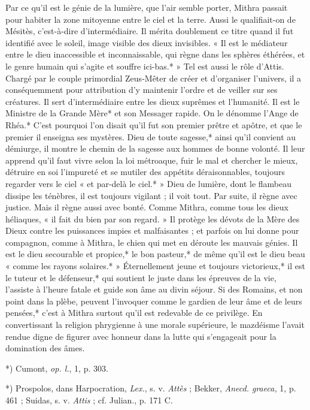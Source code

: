 \documentclass[a4paper, 11pt, oneside, polutonikogreek, french]{article}
\begin{document}
Par ce qu'il est le génie de la lumière, que l'air semble porter, Mithra passait pour habiter la zone mitoyenne entre le ciel et la terre. Aussi le qualifiait-on de Mésitès, c'est-à-dire d'intermédiaire. Il mérita doublement ce titre quand il fut identifié avec le soleil, image visible des dieux invisibles. « Il est le médiateur entre le dieu inaccessible et inconnaissable, qui règne dans les sphères éthérées, et le genre humain qui s'agite et souffre ici-bas.* » Tel est aussi le rôle d'Attis. Chargé par le couple primordial Zeus-Mêter de créer et d'organiser l'univers, il a conséquemment pour attribution d'y maintenir l'ordre et de veiller sur ses créatures. Il sert d'intermédiaire entre les dieux suprêmes et l'humanité. Il est le Ministre de la Grande Mère* et son Messager rapide. On le dénomme l'Ange de Rhéa.* C'est pourquoi l'on disait qu'il fut son premier prêtre et apôtre, et que le premier il enseigna ses mystères. Dieu de toute sagesse,* ainsi qu'il convient au démiurge, il montre le chemin de la sagesse aux hommes de bonne volonté. Il leur apprend qu'il faut vivre selon la loi métroaque, fuir le mal et chercher le mieux, détruire en soi l'impureté et se mutiler des appétits déraisonnables, toujours regarder vers le ciel « et par-delà le ciel.* » Dieu de lumière, dont le flambeau dissipe les ténèbres, il est toujours vigilant ; il voit tout. Par suite, il règne avec justice. Mais il règne aussi avec bonté. Comme Mithra, comme tous les dieux héliaques, « il fait du bien par son regard. » Il protège les dévots de la Mère des Dieux contre les puissances impies et malfaisantes ; et parfois on lui donne pour compagnon, comme à Mithra, le chien qui met en déroute les mauvais génies. Il est le dieu secourable et propice,* le bon pasteur,* de même qu'il est le dieu beau « comme les rayons solaires.* » Éternellement jeune et toujours victorieux,* il est le tuteur et le défenseur,* qui soutient le juste dans les épreuves de la vie, l'assiste à l'heure fatale et guide son âme au divin séjour. Si des Romains, et non point dans la plèbe, peuvent l'invoquer comme le gardien de leur âme et de leurs pensées,* c'est à Mithra surtout qu'il est redevable de ce privilège. En convertissant la religion phrygienne à une morale supérieure, le mazdéisme l'avait rendue digne de figurer avec honneur dans la lutte qui s'engageait pour la domination des âmes.

*) Cumont, \emph{op. l.}, 1, p. 303.

*) Prospolos, dans Harpocration, \emph{Lex.}, s. v. \emph{Attès} ; Bekker, \emph{Anecd. graeca,} 1, p. 461 ; Suidas, s. v. \emph{Attis} ; cf. Julian., p. 171 C.
\end{document}
